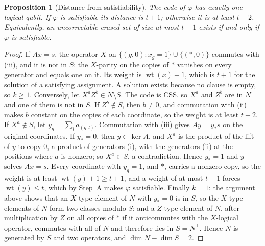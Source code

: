 \documentclass[11pt]{article}
\newtheorem{proposition}[theorem]{Proposition}
\theoremstyle{remark}
\begin{document}
\begin{proposition}[Distance from satisfiability]\label{prop:satdistance}
The code of \(\varphi\) has exactly one logical qubit. If \(\varphi\) is
satisfiable its distance is \(t+1\); otherwise it is at least \(t+2\). Equivalently, an
uncorrectable erased set of size at most \(t+1\) exists if and only if
\(\varphi\) is satisfiable.
\end{proposition}
\begin{proof}
If \(Ax=s\), the operator \(X\) on \(\{(g,0):x_g=1\}\cup\{(\ast,0)\}\)
commutes with (iii), and it is not in \(S\): the \(X\)-parity on the
copies of \(\ast\) vanishes on every generator and equals one on it. Its
weight is \(\operatorname{wt}(x)+1\), which is \(t+1\) for the solution
of a satisfying assignment. A solution exists because no clause is
empty, so \(k\ge1\). Conversely, let \(X^aZ^b\in N\setminus S\). The
code is CSS, so \(X^a\) and \(Z^b\) are in \(N\) and one of them is not
in \(S\). If \(Z^b\notin S\), then \(b\ne0\), and commutation with (ii)
makes \(b\) constant on the copies of each coordinate, so the weight is
at least \(t+2\). If \(X^a\notin S\), let \(y_g=\sum_la_{(g,l)}\).
Commutation with (iii) gives \(Ay=y_\ast s\) on the original
coordinates. If \(y_\ast=0\), then \(y\in\ker A\), and \(X^a\) is the
product of the lift of \(y\) to copy \(0\), a product of generators (i),
with the generators (ii) at the positions where \(a\) is nonzero; so
\(X^a\in S\), a contradiction. Hence \(y_\ast=1\) and \(y\) solves
\(Ax=s\). Every coordinate with \(y_g=1\), and \(\ast\), carries a
nonzero copy, so the weight is at least \(\operatorname{wt}(y)+1\ge
t+1\), and a weight of at most \(t+1\) forces \(\operatorname{wt}(y)\le
t\), which by Step~A makes \(\varphi\) satisfiable. Finally \(k=1\):
the argument above shows that an \(X\)-type element of \(N\) with
\(y_\ast=0\) is in \(S\), so the \(X\)-type elements of \(N\) form two
classes modulo \(S\); and a \(Z\)-type element of \(N\), after
multiplication by \(Z\) on all copies of \(\ast\) if it anticommutes
with the \(X\)-logical operator, commutes with all of \(N\) and
therefore lies in \(S=N^{\perp}\). Hence \(N\) is generated by \(S\) and
two operators, and \(\dim N-\dim S=2\).
\end{proof}
\end{document}
